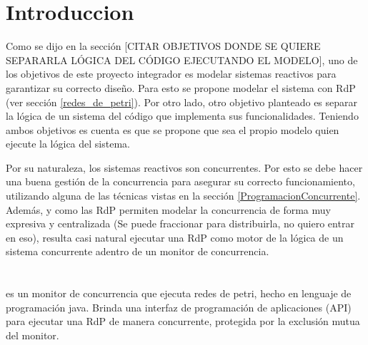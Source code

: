 \section{Introduccion}

Como se dijo en la sección [{\color{red}CITAR OBJETIVOS DONDE SE QUIERE
SEPARARLA LÓGICA DEL CÓDIGO EJECUTANDO EL MODELO}], uno de los objetivos de este proyecto integrador es
{\color{green} modelar sistemas reactivos para garantizar su correcto
diseño}.
Para esto se propone modelar el sistema con RdP (ver sección \ref{redes_de_petri}).
Por otro lado, otro objetivo planteado es {\color{green} separar la lógica de un
sistema del código que implementa sus funcionalidades}.
Teniendo ambos objetivos es cuenta es que se propone que sea el propio modelo
quien ejecute la lógica del sistema.

Por su naturaleza, los sistemas reactivos son concurrentes. Por esto se debe
hacer una buena gestión de la concurrencia para asegurar su correcto
funcionamiento, utilizando alguna de las técnicas vistas en
la sección \ref{ProgramacionConcurrente}. Además, y como las RdP permiten
modelar la concurrencia de forma muy expresiva y centralizada {\color{blue}(Se puede
fraccionar para distribuirla, no quiero entrar en eso)}, resulta casi natural
ejecutar una RdP como {\color{red} motor} de la lógica de un sistema concurrente
adentro de un monitor de concurrencia.

\section{\javapetriconcurrencymonitor}

\javapetriconcurrencymonitor es un monitor de concurrencia que ejecuta redes
de petri, hecho en lenguaje de programación java.
Brinda una interfaz de programación de aplicaciones (API) para ejecutar una RdP
de manera concurrente, protegida por la exclusión mutua del monitor.


